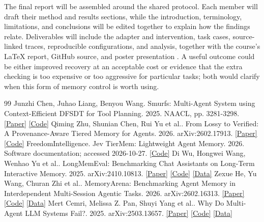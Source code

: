 \documentclass[a4paper,11pt]{article}
\begin{document}
The final report will be assembled around the shared protocol. Each member will draft their method and results sections, while the introduction, terminology, limitations, and conclusions will be edited together to explain how the findings relate. Deliverables will include the adapter and intervention, task cases, source-linked traces, reproducible configurations, and analysis, together with the course's LaTeX report, GitHub source, and poster presentation \cite{course2026}. A useful outcome could be either improved recovery at an acceptable cost or evidence that the extra checking is too expensive or too aggressive for particular tasks; both would clarify when this form of memory control is worth using.\par

\clearpage
\begin{thebibliography}{99}
\fontsize{10}{12.5}\selectfont
\setlength{\itemsep}{7pt}
Junzhi Chen, Juhao Liang, Benyou Wang. Smurfs: Multi-Agent System using Context-Efficient DFSDT for Tool Planning. 2025. NAACL, pp. 3281-3298. \href{https://aclanthology.org/2025.naacl-long.169/}{[Paper]} \href{https://github.com/FreedomIntelligence/Smurfs}{[Code]}
Qiming Zhu, Shunian Chen, Rui Yu et al.. From Lossy to Verified: A Provenance-Aware Tiered Memory for Agents. 2026. arXiv:2602.17913. \href{https://arxiv.org/abs/2602.17913}{[Paper]} \href{https://github.com/FreedomIntelligence/Tiermem}{[Code]}
FreedomIntelligence. Jev TierMem: Lightweight Agent Memory. 2026. Software documentation; accessed 2026-10-27. \href{https://github.com/FreedomIntelligence/Tiermem/tree/d0d3896e917117ba0fcc1501e2b2dae891d2a2e3/jev_tiermem}{[Code]}
Di Wu, Hongwei Wang, Wenhao Yu et al.. LongMemEval: Benchmarking Chat Assistants on Long-Term Interactive Memory. 2025. arXiv:2410.10813. \href{https://arxiv.org/abs/2410.10813}{[Paper]} \href{https://github.com/xiaowu0162/LongMemEval}{[Code]} \href{https://huggingface.co/datasets/xiaowu0162/longmemeval-cleaned}{[Data]}
Zexue He, Yu Wang, Churan Zhi et al.. MemoryArena: Benchmarking Agent Memory in Interdependent Multi-Session Agentic Tasks. 2026. arXiv:2602.16313. \href{https://arxiv.org/abs/2602.16313}{[Paper]} \href{https://github.com/ZexueHe/MemoryArena}{[Code]} \href{https://huggingface.co/datasets/ZexueHe/memoryarena}{[Data]}
Mert Cemri, Melissa Z. Pan, Shuyi Yang et al.. Why Do Multi-Agent LLM Systems Fail?. 2025. arXiv:2503.13657. \href{https://arxiv.org/abs/2503.13657}{[Paper]} \href{https://github.com/multi-agent-systems-failure-taxonomy/MAST}{[Code]} \href{https://huggingface.co/datasets/mcemri/MAST-Data}{[Data]}

\end{thebibliography}
\end{document}
